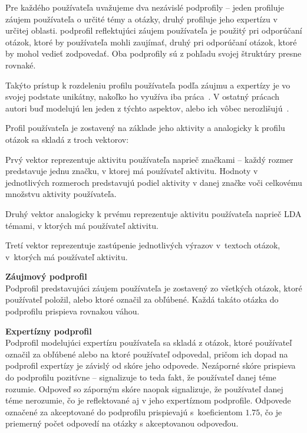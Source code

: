 Pre každého používateľa uvažujeme dva nezávislé podprofily -- jeden profiluje záujem používateľa o určité témy a otázky,
druhý profiluje jeho expertízu v určitej oblasti. podprofil reflektujúci záujem používateľa je použitý
pri odporúčaní otázok, ktoré by používateľa mohli zaujímať, druhý pri odporúčaní otázok, ktoré by mohol vedieť zodpovedať.
Oba podprofily sú z pohľadu svojej štruktúry presne rovnaké.

Takýto prístup k rozdeleniu profilu používateľa podľa záujmu a expertízy je vo svojej podstate unikátny, nakoľko ho využíva
iba práca~\cite{Xu2012}. V ostatný prácach autori buď modelujú len jeden z týchto aspektov, alebo ich vôbec nerozlišujú~\cite{Srba2016}.

Profil používateľa je zostavený na základe jeho aktivity a analogicky k profilu otázok sa skladá z troch vektorov:

\begin{my_enumerate}
\item{
  Prvý vektor reprezentuje aktivitu používateľa naprieč značkami -- každý rozmer predstavuje jednu značku,
  v ktorej má používateľ aktivitu. Hodnoty v jednotlivých rozmeroch predstavujú podiel aktivity v danej značke voči
  celkovému množstvu aktivity používateľa.
}
\item{
  Druhý vektor analogicky k prvému reprezentuje aktivitu používateľa naprieč LDA témami, v ktorých má používateľ aktivitu.
}
\item{
  Tretí vektor reprezentuje zastúpenie jednotlivých výrazov v~textoch otázok, v~ktorých má používateľ aktivitu.
}
\end{my_enumerate}

\textbf{Záujmový podprofil}\\
Podprofil predstavujúci záujem používateľa je zostavený zo všetkých otázok, ktoré používateľ položil, alebo ktoré označil
za obľúbené. Každá takáto otázka do podprofilu prispieva rovnakou váhou.

\textbf{Expertízny podprofil}\\
Podprofil modelujúci expertízu používateľa sa skladá z otázok, ktoré používateľ označil za obľúbené alebo
na ktoré používateľ odpovedal, pričom ich dopad na podprofil expertízy je závislý od skóre jeho odpovede.
Nezáporné skóre prispieva do podprofilu pozitívne -- signalizuje to teda
fakt, že používateľ danej téme rozumie. Odpoveď so záporným skóre naopak signalizuje, že používateľ danej téme nerozumie,
čo je reflektované aj v jeho expertíznom podprofile. Odpovede označené za akceptované do podprofilu prispievajú
s~koeficientom $1.75$, čo je priemerný počet odpovedí na otázky s akceptovanou odpoveďou.

